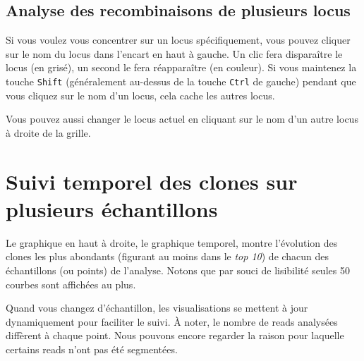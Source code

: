 \documentclass[11pt]{article}
\begin{document}
\subsection{Analyse des recombinaisons de plusieurs locus}

Si vous voulez vous concentrer sur un locus spécifiquement, vous pouvez
cliquer sur le nom du locus dans l'encart en haut à gauche. Un clic fera
disparaître le locus (en grisé), un second le fera réapparaître (en
couleur). Si vous maintenez la touche \texttt{Shift} (généralement au-dessus de
la touche \texttt{Ctrl} de gauche) pendant que vous cliquez sur le nom d'un
locus, cela cache les autres locus.


Vous pouvez aussi changer le locus actuel en cliquant sur le nom d'un
autre locus à droite de la grille.

\section{Suivi temporel des clones sur plusieurs échantillons}
\label{sec:tracking}


Le graphique en haut à droite, le graphique temporel, montre l'évolution des
clones les plus abondants (figurant au moins dans le \textit{top 10}) de chacun des
échantillons (ou points) de l'analyse.
Notons que par souci de lisibilité seules 50 courbes sont affichées au plus.


Quand vous changez d'échantillon, les visualisations se mettent à jour
dynamiquement pour faciliter le suivi. À noter, le nombre de reads
analysées diffèrent à chaque point. Nous pouvons encore
regarder la raison pour laquelle certains reads n'ont pas été segmentées.
\end{document}
